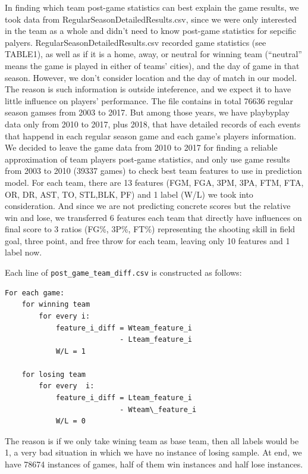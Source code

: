 \documentclass[12pt]{article}
\begin{document}
\quad In finding which team post-game statistics can best explain the game results, we took data from RegularSeasonDetailedResults.csv, since we were only interested in the team as a whole and didn’t need to know post-game statistics for sepcific palyers. RegularSeasonDetailedResults.csv recorded game statistics (see TABLE1), as well as if it is a home, away, or neutral for winning team (“neutral” means the game is played in either of teams’ cities), and the day of game in that season. However, we don’t consider location and the day of match in our model. The reason is such information is outside inteference, and we expect it to have little influence on players’ performance. The file contains in total 76636 regular season gamses from 2003 to 2017. But among those years, we have playbyplay data only from 2010 to 2017, plus 2018, that have detailed records of each events that happend in each regular season game and each game’s players information. We decided to leave the game data from 2010 to 2017 for finding a reliable approximation of team players post-game statistics, and only use game results from 2003 to 2010 (39337 games) to check best team features to use in prediction model. For each team, there are 13 features (FGM, FGA, 3PM, 3PA, FTM, FTA, OR, DR, AST, TO, STL,BLK, PF) and 1 label (W/L) we took into consideration. And since we are not predicting concrete scores but the relative win and lose, we transferred 6 features each team that directly have influences on final score to 3 ratios (FG\%, 3P\%, FT\%) representing the shooting skill in field goal, three point, and free throw for each team, leaving only 10 features and 1 label now.

\quad Each line of \texttt{post\_game\_team\_diff.csv} is constructed as follows: \\


\lstset{language=Python, upquote=true}
\begin{lstlisting}[basicstyle=\small\tt]
For each game:
    for winning team
        for every i:
            feature_i_diff = Wteam_feature_i 
                           - Lteam_feature_i 
            W/L = 1 

    for losing team
        for every  i: 
            feature_i_diff = Lteam_feature_i 
                           - Wteam\_feature_i
            W/L = 0
\end{lstlisting}

\quad The reason is if we only take wining team as base team, then all labels would be 1, a very bad situation in which we have no instance of losing sample. At end, we have 78674 instances of games, half of them win instances and half lose instances.
\end{document}
